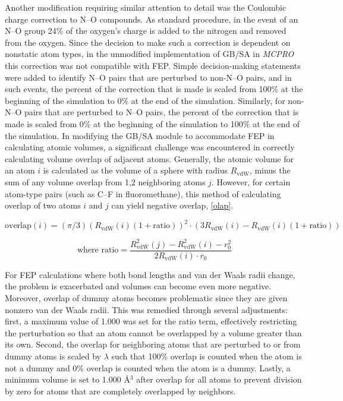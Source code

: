 \documentclass[12pt]{report}
\begin{document}
Another modification requiring similar attention to detail was the Coulombic charge correction to N--O compounds. As standard procedure, in the event of an N--O group 24\% of the oxygen's charge is added to the nitrogen and removed from the oxygen. Since the decision to make such a correction is dependent on nonstatic atom types, in the unmodified implementation of GB/SA in \textit{MCPRO} this correction was not compatible with FEP. Simple decision-making statements were added to identify N--O pairs that are perturbed to non-N--O pairs, and in such events, the percent of the correction that is made is scaled from 100\% at the beginning of the simulation to 0\% at the end of the simulation. Similarly, for non-N--O pairs that are perturbed to N--O pairs, the percent of the correction that is made is scaled from 0\% at the beginning of the simulation to 100\% at the end of the simulation. In modifying the GB/SA module to accommodate FEP in calculating atomic volumes, a significant challenge was encountered in correctly calculating volume overlap of adjacent atoms. Generally, the atomic volume for an atom $i$ is calculated as the volume of a sphere with radius $R_{ \textrm{vdW}}$, minus the sum of any volume overlap from 1,2 neighboring atoms $j$. However, for certain atom-type pairs (such as C--F in fluoromethane), this method of calculating overlap of two atoms $i$ and $j$ can yield negative overlap, \cref{olap}.\vspace*{-0.6cm}

\vspace*{-.4cm}
\begin{equation}
\label{olap}
\textrm{overlap}(i) = (\pi/3)(R_{ \textrm{vdW}}(i)(1+ \textrm{ratio}))^{2}\cdot(3R_{ \textrm{vdW}}(i) - R_{ \textrm{vdW}}(i)(1+ \textrm{ratio}))
\end{equation}
\vspace*{-1.7cm}

\begin{equation*}
\textrm{where ratio} = \frac{R^{2}_{ \textrm{vdW}}(j) - R^{2}_{ \textrm{vdW}}(i) - r^{2}_{0}}{2R_{ \textrm{vdW}}(i) \cdot r_{0}}
\end{equation*}
\vspace*{-0.4cm}

For FEP calculations where both bond lengths and van der Waals radii change, the problem is exacerbated and volumes can become even more negative. Moreover, overlap of dummy atoms becomes problematic since they are given nonzero van der Waals radii. This was remedied through several adjustments: first, a maximum value of 1.000 was set for the ratio term, effectively restricting the perturbation so that an atom cannot be overlapped by a volume greater than its own. Second, the overlap for neighboring atoms that are perturbed to or from dummy atoms is scaled by $\lambda$ such that 100\% overlap is counted when the atom is not a dummy and 0\% overlap is counted when the atom is a dummy. Lastly, a minimum volume is set to 1.000 \AA$^{3}$ after overlap for all atoms to prevent division by zero for atoms that are completely overlapped by neighbors.
\end{document}
